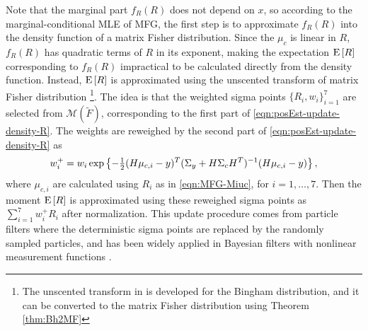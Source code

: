 Note that the marginal part $f_R(R)$ does not depend on $x$, so according to the marginal-conditional MLE of MFG, the first step is to approximate $f_R(R)$ into the density function of a matrix Fisher distribution.
Since the $\mu_c$ is linear in $R$, $f_R(R)$ has quadratic terms of $R$ in its exponent, making the expectation $\mathrm{E}\left[ R \right]$ corresponding to $f_R(R)$ impractical to be calculated directly from the density function.
Instead, $\mathrm{E}\left[ R \right]$ is approximated using the unscented transform of matrix Fisher distribution \cite{gilitschenski2015unscented,lee2018bayesian} \footnote{The unscented transform in \cite{gilitschenski2015unscented} is developed for the Bingham distribution, and it can be converted to the matrix Fisher distribution using Theorem \ref{thm:Bh2MF}}.
The idea is that the weighted sigma points $\{R_i,w_i\}_{i=1}^7$ are selected from $\mathcal{M}(\tilde{F})$, corresponding to the first part of \eqref{eqn:posEst-update-density-R}.
The weights are reweighed by the second part of \eqref{eqn:posEst-update-density-R} as
\begin{align} \label{eqn:posEst-update-sigmapoints}
	w_i^+ = w_i \exp\left\{ -\tfrac{1}{2}(H\mu_{c,i}-y)^T (\Sigma_y+H\Sigma_cH^T)^{-1} (H\mu_{c,i}-y) \right\},
\end{align}
where $\mu_{c,i}$ are calculated using $R_i$ as in \eqref{eqn:MFG-Miuc}, for $i=1,\dots,7$.
Then the moment $\mathrm{E}\left[ R \right]$ is approximated using these reweighed sigma points as $\sum_{i=1}^7 w_i^+R_i$ after normalization.
This update procedure comes from particle filters \cite{arulampalam2002tutorial} where the deterministic sigma points are replaced by the randomly sampled particles, and has been widely applied in Bayesian filters with nonlinear measurement functions \cite{kurz2016recursive}.

